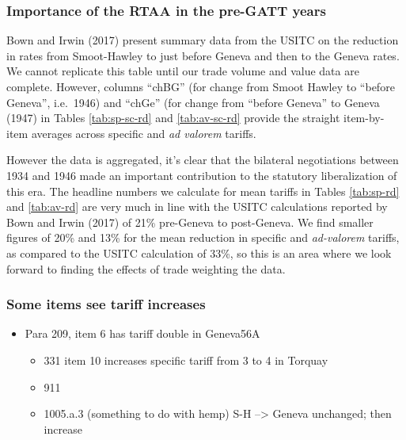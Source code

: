 \documentclass[
  12pt,
]{article}
\providecommand{\tightlist}{%
  \setlength{\itemsep}{0pt}\setlength{\parskip}{0pt}}
\begin{document}
\hypertarget{importance-of-the-rtaa-in-the-pre-gatt-years}{%
\subsubsection{Importance of the RTAA in the pre-GATT years}\label{importance-of-the-rtaa-in-the-pre-gatt-years}}

Bown and Irwin (2017) present summary data from the USITC on the reduction in rates from Smoot-Hawley to just before Geneva and then to the Geneva rates. We cannot replicate this table until our trade volume and value data are complete.
However, columns ``chBG'' (for change from Smoot Hawley to ``before Geneva'', i.e.~1946) and ``chGe'' (for change from ``before Geneva'' to Geneva (1947) in Tables \ref{tab:sp-sc-rd} and \ref{tab:av-sc-rd} provide the straight item-by-item averages across specific and \emph{ad valorem} tariffs.

However the data is aggregated, it's clear that the bilateral negotiations between 1934 and 1946 made an important contribution to the statutory liberalization of this era. The headline numbers we calculate for mean tariffs in Tables \ref{tab:sp-rd} and \ref{tab:av-rd} are very much in line with the USITC calculations reported by Bown and Irwin (2017) of 21\% pre-Geneva to post-Geneva. We find smaller figures of 20\% and 13\% for the mean reduction in specific and \emph{ad-valorem} tariffs, as compared to the USITC calculation of 33\%, so this is an area where we look forward to finding the effects of trade weighting the data.

\hypertarget{some-items-see-tariff-increases}{%
\subsubsection{Some items see tariff increases}\label{some-items-see-tariff-increases}}

\begin{itemize}
\item
  Para 209, item 6 has tariff double in Geneva56A

  \begin{itemize}
  \tightlist
  \item
    331 item 10 increases specific tariff from 3 to 4 in Torquay
  \item
    911
  \item
    1005.a.3 (something to do with hemp) S-H --\textgreater{} Geneva unchanged; then increase
  \end{itemize}
\end{itemize}
\end{document}
